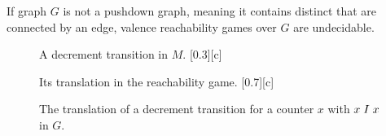 \documentclass[../../diss.tex]{subfiles}
\begin{document}
\begin{proposition}%
\label{Proposition:ValenceReachabilityGamesUndecidable}%
    If graph $G$ is not a pushdown graph, meaning it contains distinct that are connected by an edge, valence reachability games over $G$ are undecidable.
\end{proposition}


\begin{figure}[t]
    {%
        \centering%
        \subcaptionbox%
        {%
            A decrement transition in $M$.%
            \label{Figure:ValenceReachabilityGamesDecrementOriginal}%
        }[0.3\textwidth][c]%
        {%
            
        }%
    }%
    {%
    \centering%
    \subcaptionbox%
        {%
            Its translation in the reachability game.%
            \label{Figure:ValenceReachabilityGamesDecrementTranslation}%
        }[0.7\textwidth][c]%
        {%
            
        }%
    }%
    \caption{The translation of a decrement transition for a counter $x$ with $x \mathrel{I} x$ in $G$.}%
    \label{Figure:ValenceReachabilityGamesDecrement}%
\end{figure}
\end{document}
